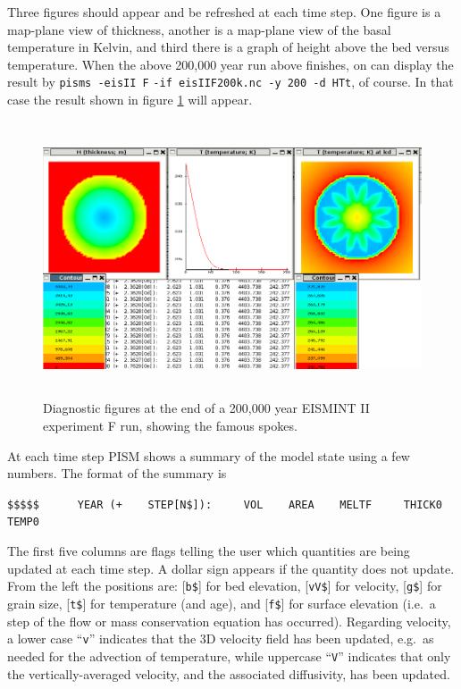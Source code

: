 \documentclass[12pt,final]{amsart}
\renewcommand{\t}[1]{\texttt{#1}}
\begin{document}
Three figures should appear and be refreshed at each time step.  One figure is a map-plane view of thickness, another is a map-plane view of the basal temperature in Kelvin, and third there is a graph of height above the bed versus temperature.  When the above 200,000 year run above finishes, on can display the result by \verb|pisms -eisII F| \verb|-if eisIIF200k.nc -y 200 -d HTt|, of course.  In that case the result shown in figure \ref{fig:screenshot} will appear.
\medskip

\begin{figure}[ht]
\includegraphics[height=3.2in,keepaspectratio=true]{figs/eisIIFshot}
\caption{Diagnostic figures at the end of a 200,000 year EISMINT II experiment F run, showing the famous spokes.}
\label{fig:screenshot}
\end{figure}

At each time step PISM shows a summary of the model state using a few numbers.  The format of the summary is

\small\verb|$$$$$      YEAR (+    STEP[N$]):     VOL    AREA    MELTF     THICK0     TEMP0|\normalsize

\noindent The first five columns are flags telling the user which quantities are being updated at each time step.  A dollar sign appears if the quantity does not update.  From the left the positions are: [\t{b\$}] for bed elevation, [\t{vV\$}] for velocity, [\t{g\$}] for grain size, [\t{t\$}] for temperature (and age), and [\t{f\$}] for surface elevation (i.e.~a step of the flow or mass conservation equation has occurred).  Regarding velocity, a lower case ``\texttt{v}'' indicates that the 3D velocity field has been updated, e.g.~as needed for the advection of temperature, while uppercase ``\texttt{V}'' indicates that only the vertically-averaged velocity, and the associated diffusivity, has been updated.
\end{document}
